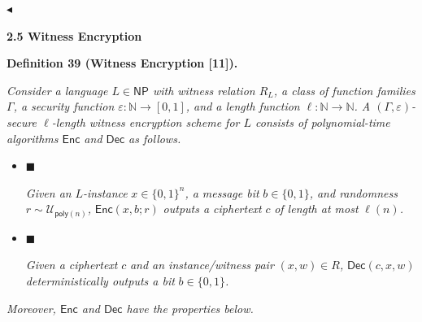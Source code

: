 $\blacktriangleleft$\par






\par\medskip\noindent\textbf{
2.5 Witness Encryption}\par





\par\medskip\noindent\textbf{
\textbf{Definition 39}\textbf{ }(Witness Encryption [11])\textbf{.}
}\par



\emph{Consider a language $L\in{\mathsf{NP}}$ with witness relation $R_{L}$, a class of function families $\Gamma$, a security function $\varepsilon:\mathbb{N}\to[0,1]$, and a length function $\ell:\mathbb{N}\to\mathbb{N}$. A $(\Gamma,\varepsilon)$-secure $\ell$-length witness encryption scheme for $L$ consists of polynomial-time algorithms ${\mathsf{Enc}}$ and ${\mathsf{Dec}}$ as follows.}\par


\begin{itemize}


\item[] 
$\blacksquare$ 


\emph{Given an }$L$\emph{-instance }$x\in\{0,1\}^{n}$\emph{, a message bit }$b\in\{0,1\}$\emph{, and randomness }$r\sim\mathcal{U}_{{\mathsf{poly}}(n)}$\emph{, }${\mathsf{Enc}}(x,b;r)$\emph{ outputs a ciphertext }$c$\emph{ of length at most }$\ell(n)$\emph{.}\par





\item[] 
$\blacksquare$ 


\emph{Given a ciphertext }$c$\emph{ and an instance/witness pair }$(x,w)\in R$\emph{, }${\mathsf{Dec}}(c,x,w)$\emph{ deterministically outputs a bit }$b\in\{0,1\}$\emph{.}\par





\end{itemize}


\emph{Moreover, ${\mathsf{Enc}}$ and ${\mathsf{Dec}}$ have the properties below.}\par


